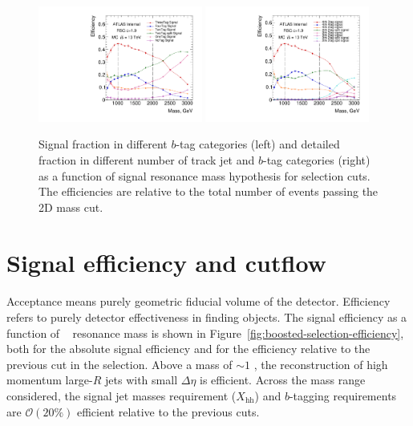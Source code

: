 \begin{figure}
\begin{center}
\includegraphics[width=0.48\textwidth,angle=-90]{figures/boosted/SigEff/region_lst_Moriond_Efficiency_AllTag_Signal.pdf}
\includegraphics[width=0.48\textwidth,angle=-90]{figures/boosted/SigEff/detail_lst_Moriond_Efficiency_AllTag_Signal.pdf}
  \caption{Signal fraction in different $b$-tag categories (left) and detailed fraction in different number of track jet and $b$-tag categories (right) as a function of signal resonance mass hypothesis for selection cuts. The efficiencies are relative to the total number of events passing the 2D mass cut.}
  \label{fig:boosted-nbjet-signal-efficiency}
\end{center}
\end{figure}



\section{Signal efficiency and cutflow}
\paragraph{}
Acceptance means purely geometric fiducial volume of the detector. Efficiency refers to purely detector effectiveness in finding objects.
The signal efficiency as a function of \Grav~ resonance mass is shown in Figure~\ref{fig:boosted-selection-efficiency}, both for the absolute signal efficiency and for the efficiency relative to the previous cut in the selection.
Above a mass of $\sim\!1$ \TeV, the reconstruction of high momentum large-$R$ jets with small $\Delta\eta$ is efficient. 
Across the mass range considered, the signal jet masses requirement ($X_\text{hh}$) and $b$-tagging requirements are $\mathcal{O}(20\%)$ efficient relative to the previous cuts.

